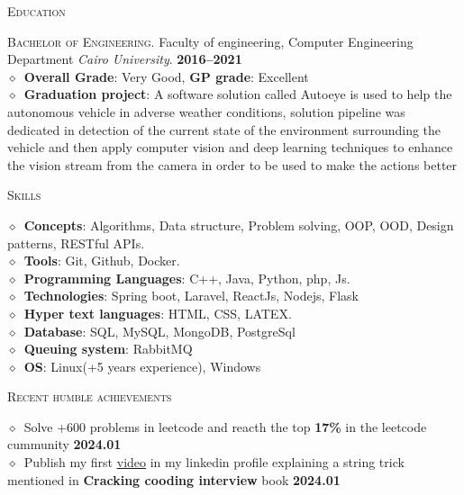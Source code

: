 \documentclass[11pt, a4paper]{article}
\newcommand{\dates}[1]{\hfill\mbox{\textbf{#1}}} %
\newcommand{\smaller}[1]{{\small$\diamond$\ #1}}
\newcommand{\headright}[1]{\vspace*{2.5ex}\textsc{\Large\color{secondColor}#1}\par%
     \vspace*{-2ex}{\color{secondColor}\hrulefill}\par}
\begin{document}
\begin{minipage}[t]{0.56\textwidth}
\headright{Education}
\textsc{Bachelor of Engineering.} Faculty of engineering, Computer Engineering Department \textit{Cairo University}.  \dates{2016--2021} \\
\smaller{\textbf{Overall Grade}: Very Good, \textbf{GP grade}: Excellent} \\
\smaller{\textbf{Graduation project}: A software solution called Autoeye is used to help the autonomous vehicle in adverse weather conditions, solution
pipeline was dedicated in detection of the current state of the environment surrounding the vehicle and then apply computer vision and
deep learning techniques to enhance the vision stream from the camera in order to be used to make the actions better}

\headright{Skills}
\smaller{\textbf{Concepts}: Algorithms, Data structure, Problem solving, OOP, OOD, Design patterns, RESTful APIs.} \\
\smaller{\textbf{Tools}: Git, Github, Docker.} \\
\smaller{\textbf{Programming Languages}: C++, Java, Python, php, Js.} \\
\smaller{\textbf{Technologies}: Spring boot, Laravel, ReactJs, Nodejs, Flask} \\
\smaller{\textbf{Hyper text languages}: HTML, CSS, LATEX.} \\ 
\smaller{\textbf{Database}: SQL, MySQL, MongoDB, PostgreSql} \\
\smaller{\textbf{Queuing system}: RabbitMQ} \\
\smaller{\textbf{OS}: Linux(+5 years experience), Windows}

\headright{Recent humble achievements}
\smaller{Solve +600 problems in leetcode and reacth the top \textbf{17\%} in the leetcode cummunity} \dates{2024.01} \\
\smaller{Publish my first \href{https://www.linkedin.com/posts/sofyanmahmoud0000_the-difference-between-str-str-activity-7151649201855045634-XyjD?utm_source=share&utm_medium=member_desktop}{video} in my linkedin profile explaining a string trick mentioned in \textbf{Cracking cooding interview} book} \dates{2024.01} \\

\end{minipage}
\end{document}
